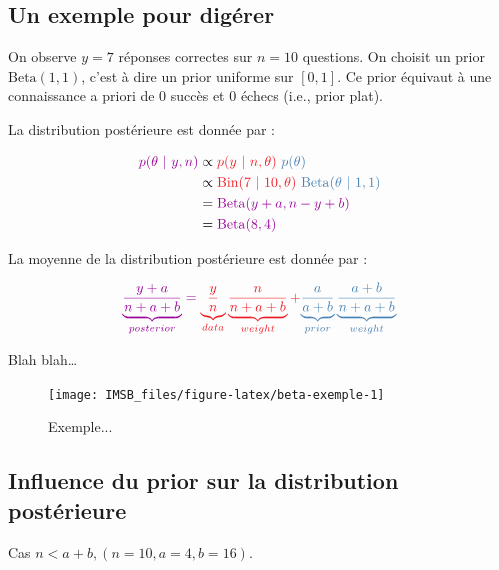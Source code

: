 \documentclass[
  a4paper,11pt,twoside,onecolumn,openright,final,oldfontcommands]{memoir}
\theoremstyle{definition}
\theoremstyle{definition}
\theoremstyle{definition}
\theoremstyle{definition}
\theoremstyle{remark}
\begin{document}
\hypertarget{un-exemple-pour-diguxe9rer}{%
\subsection{Un exemple pour digérer}\label{un-exemple-pour-diguxe9rer}}

On observe \(y = 7\) réponses correctes sur \(n = 10\) questions. On choisit un prior \(\mathrm{Beta}(1, 1)\), c'est à dire un prior uniforme sur \([0, 1]\). Ce prior équivaut à une connaissance a priori de 0 succès et 0 échecs (i.e., prior plat).

La distribution postérieure est donnée par :

\[
\begin{aligned}
\color{purple}{p(\theta \ | \ y, n)} &\propto \color{orangered}{p(y \ | \ n, \theta)} \ \color{steelblue}{p(\theta)} \\
&\propto \color{orangered}{\mathrm{Bin}(7 \ | \ 10, \theta)} \ \color{steelblue}{\mathrm{Beta}(\theta \ | \ 1, 1)} \\
&= \color{purple}{\mathrm{Beta}(y + a, n - y + b)} \\
&= \color{purple}{\mathrm{Beta}(8, 4)}
\end{aligned}
\]

La moyenne de la distribution postérieure est donnée par :

\[
\color{purple}{\underbrace{\frac{y + a}{n + a + b}}_{posterior}} = \color{orangered}{\underbrace{\frac{y}{n}}_{data}} \underbrace{\frac{n}{n + a + b}}_{weight} + \color{steelblue}{\underbrace{\frac{a}{a + b}}_{prior}} \underbrace{\frac{a + b}{n + a + b}}_{weight}
\]

Blah blah\ldots{}

\begin{figure}[!htb]

{\centering \texttt{[image: IMSB\_files/figure-latex/beta-exemple-1]} 

}

\caption{Exemple...}\label{fig:beta-exemple}
\end{figure}

\hypertarget{influence-du-prior-sur-la-distribution-postuxe9rieure}{%
\subsection{Influence du prior sur la distribution postérieure}\label{influence-du-prior-sur-la-distribution-postuxe9rieure}}

Cas \(n < a + b, (n = 10, a = 4, b = 16)\).
\end{document}
